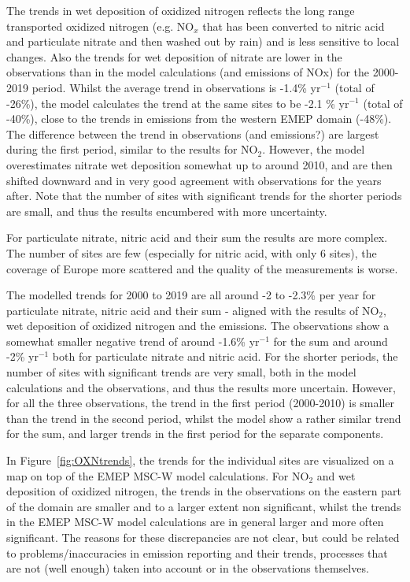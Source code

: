 The trends in wet deposition of oxidized nitrogen reflects the long range transported oxidized nitrogen (e.g. NO$_x$ that has been converted to nitric acid and particulate nitrate and then washed out by rain) and is less sensitive to local changes. Also the trends for wet deposition of nitrate are lower in the observations than in the model calculations (and emissions of NOx) for the 2000-2019 period. Whilst the average trend in observations is -1.4\% yr$^{-1}$ (total of -26\%), the model calculates the trend at the same sites to be -2.1 \% yr$^{-1}$ (total of -40\%), close to the trends in emissions from the western EMEP domain (-48\%). The difference between the trend in observations (and emissions?) are largest during the first period, similar to the results for NO$_2$. However, the model overestimates nitrate wet deposition somewhat up to around 2010, and are then shifted downward and in very good agreement with observations for the years after. Note that the number of sites with significant trends for the shorter periods are small, and thus the results encumbered with more uncertainty.

For particulate nitrate, nitric acid and their sum the results are more complex. The number of sites are few (especially for nitric acid, with only 6 sites), the coverage of Europe more scattered and the quality of the measurements is worse. 

The modelled trends for 2000 to 2019 are all around -2 to -2.3\% per year for particulate nitrate, nitric acid and their sum - aligned with the results of NO$_2$, wet deposition of oxidized nitrogen and the emissions. The observations show a somewhat smaller negative trend of around -1.6\% yr$^{-1}$ for the sum and around -2\% yr$^{-1}$ both for particulate nitrate and nitric acid. For the shorter periods, the number of sites with significant trends are very small, both in the model calculations and the observations, and thus the results more uncertain.
However, for all the three observations, the trend in the first period (2000-2010) is smaller than the trend in the second period, whilst the model show a rather similar trend for the sum, and larger trends in the first period for the separate components.

In Figure~\ref{fig:OXNtrends}, the trends for the individual sites are visualized on a map on top of the EMEP MSC-W model calculations. For NO$_2$ and wet deposition of oxidized nitrogen, the trends in the observations on the eastern part of the domain are smaller and to a larger extent non significant, whilst the trends in the EMEP MSC-W model calculations are in general larger and more often significant. The reasons for these discrepancies are not clear, but could be related to problems/inaccuracies in emission reporting and their trends, processes that are not (well enough) taken into account or in the observations themselves.

